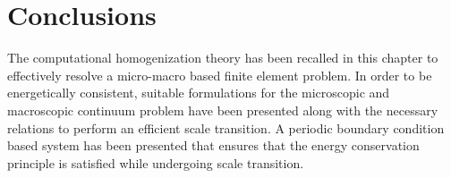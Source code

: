 
\section{Conclusions}
The computational homogenization theory has been recalled in this chapter to effectively resolve a micro-macro based finite element problem. In order to be energetically consistent, suitable formulations for the microscopic and macroscopic continuum problem have been presented along with the necessary relations to perform an efficient scale transition. A periodic boundary condition based system has been presented that ensures that the energy conservation principle is satisfied while undergoing scale transition. 

